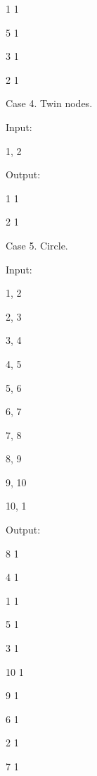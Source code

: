 \begin{itemize*}
1	1

5	1

3	1

2	1

\item{Case 4. Twin nodes.}

Input:

1, 2

Output:

1	1

2	1

\item{Case 5. Circle.}

Input:

1, 2

2, 3

3, 4

4, 5

5, 6

6, 7

7, 8

8, 9

9, 10

10, 1

Output:

8	1

4	1

1	1

5	1

3	1

10	1

9	1

6	1

2	1

7	1
\end{itemize*}

